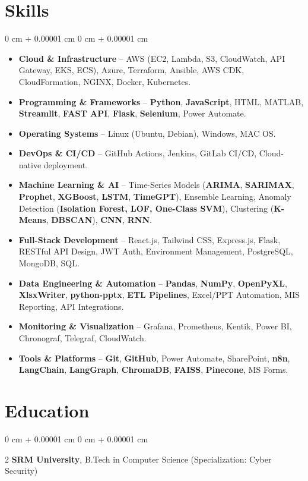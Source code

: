 \documentclass[10pt, letterpaper]{article}
\newenvironment{highlightsforbulletentries}{
    \begin{itemize}[
        topsep=0.10 cm,
        parsep=0.10 cm,
        partopsep=0pt,
        itemsep=0pt,
        leftmargin=10pt
    ]
}{
    \end{itemize}
} %
\newenvironment{onecolentry}{
    \begin{adjustwidth}{
        0 cm + 0.00001 cm
    }{
        0 cm + 0.00001 cm
    }
}{
    \end{adjustwidth}
} %
\newenvironment{twocolentry}[2][]{
    \onecolentry
    \def\secondColumn{#2}
    \setcolumnwidth{\fill, 4.5 cm}
    \begin{paracol}{2}
}{
    \switchcolumn \raggedleft \secondColumn
    \end{paracol}
    \endonecolentry
} %
\begin{document}
 \section{Skills}
\begin{onecolentry}
    \begin{highlightsforbulletentries}
        \item \textbf{Cloud \& Infrastructure} – AWS (EC2, Lambda, S3, CloudWatch, API Gateway, EKS, ECS), Azure, Terraform, Ansible, AWS CDK, CloudFormation, NGINX, Docker, Kubernetes.
        \item \textbf{Programming \& Frameworks} – \textbf{Python}, \textbf{JavaScript}, HTML, MATLAB, \textbf{Streamlit}, \textbf{FAST API}, \textbf{Flask}, \textbf{Selenium}, Power Automate.
        \item \textbf{Operating Systems} – Linux (Ubuntu, Debian), Windows, MAC OS.
        \item \textbf{DevOps \& CI/CD} – GitHub Actions, Jenkins, GitLab CI/CD, Cloud-native deployment.
        \item \textbf{Machine Learning \& AI} – Time-Series Models (\textbf{ARIMA}, \textbf{SARIMAX}, \textbf{Prophet}, \textbf{XGBoost}, \textbf{LSTM}, \textbf{TimeGPT}), Ensemble Learning, Anomaly Detection (\textbf{Isolation Forest, LOF, One-Class SVM}), Clustering (\textbf{K-Means}, \textbf{DBSCAN}), \textbf{CNN}, \textbf{RNN}.
        \item \textbf{Full-Stack Development} – React.js, Tailwind CSS, Express.js, Flask, RESTful API Design, JWT Auth, Environment Management, PostgreSQL, MongoDB, SQL.
        \item \textbf{Data Engineering \& Automation} – \textbf{Pandas}, \textbf{NumPy}, \textbf{OpenPyXL}, \textbf{XlsxWriter}, \textbf{python-pptx}, \textbf{ETL Pipelines}, Excel/PPT Automation, MIS Reporting, API Integrations.
        \item \textbf{Monitoring \& Visualization} – Grafana, Prometheus, Kentik, Power BI, Chronograf, Telegraf, CloudWatch.
        \item \textbf{Tools \& Platforms} – \textbf{Git}, \textbf{GitHub}, Power Automate, SharePoint, \textbf{n8n}, \textbf{LangChain}, \textbf{LangGraph}, \textbf{ChromaDB}, \textbf{FAISS}, \textbf{Pinecone}, MS Forms.
    \end{highlightsforbulletentries}
\end{onecolentry}

        \section{Education}
\begin{twocolentry}{}{}
    \textbf{SRM University}, B.Tech in Computer Science (Specialization: Cyber Security)
\end{twocolentry}
        \vspace{0.2 cm}
\end{document}
